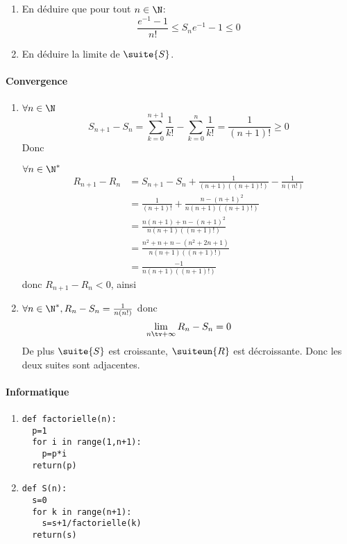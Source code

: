 \documentclass[a4paper, 11pt,reqno]{article}
\begin{document}
\begin{exercice}
\begin{enumerate}
\item En déduire que pour tout $n\in \N$:  $$ \frac{e^{-1}-1}{n!} \leq S_ne^{-1}-1\leq 0$$
\item En déduire la limite de $\suite{S}$. 
\end{enumerate}

\end{exercice}
\begin{correction}
\paragraph{Convergence}
\begin{enumerate}
\item $\forall n\in \N$ 
$$S_{n+1}-S_n = \sum_{k=0}^{n+1} \frac{1}{k!}- \sum_{k=0}^n \frac{1}{k!}=\frac{1}{(n+1)!}\geq 0$$
Donc 

 $\forall n\in \N^*$ 
 \begin{align*}
 R_{n+1}-R_n &= S_{n+1}-S_n +\frac{1}{(n+1) ((n+1)!)}-\frac{1}{n (n!)}\\
 					&=\frac{1}{(n+1)!} +\frac{n-(n+1)^2}{n(n+1)((n+1)!)}\\
 					&=\frac{n(n+1)+n-(n+1)^2}{n(n+1)((n+1)!)}\\
 					&=\frac{n^2+n+n-(n^2+2n+1)}{n(n+1)((n+1)!)}\\
 					&=\frac{-1}{n(n+1)((n+1)!)}
 \end{align*}
donc $R_{n+1}-R_n<0$, ainsi

\item $\forall n \in \N^*,  R_n-S_n=\frac{1}{n (n!)}$ donc 
$$\lim_{n\tv +\infty} R_n-S_n= 0$$
De plus $\suite{S}$ est croissante, $\suiteun{R}$ est décroissante. Donc les deux suites sont adjacentes. 


\end{enumerate}
\paragraph{Informatique}
\begin{enumerate}
\item \begin{lstlisting}
def factorielle(n):
  p=1
  for i in range(1,n+1):
    p=p*i
  return(p)
\end{lstlisting}
\item \begin{lstlisting}
def S(n):
  s=0
  for k in range(n+1):
    s=s+1/factorielle(k)
  return(s)
  

\end{lstlisting}
\end{enumerate}
\end{correction}
\end{document}
